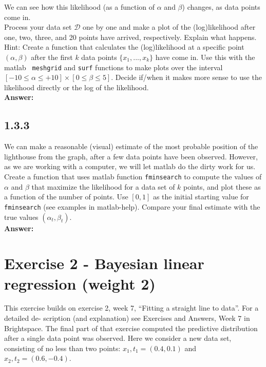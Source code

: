 \documentclass[a4paper]{article}
\begin{document}
We can see how this likelihood (as a function of $\alpha$ and $\beta$) changes, as data points come in.\\

Process your data set $\mathcal{D}$ one by one and make a plot of the (log)likelihood after one, two, three, and 20 points have arrived, respectively. Explain what happens.\\

Hint: Create a function that calculates the (log)likelihood at a specific point $(\alpha, \beta)$ after the first $k$ data points $\{x_1, . . . , x_k \}$ have come in. Use this with the matlab \texttt{ meshgrid} and \texttt{surf}  functions to make plots over the interval $[-10 \leq \alpha \leq +10] \times [0 \leq \beta \leq 5]$. Decide if/when it makes more sense to use the likelihood directly or the log of the likelihood.\\

\textbf{Answer:}\\



\subsection*{1.3.3}

We can make a reasonable (visual) estimate of the most probable position of the lighthouse from the graph, after a few data points have been observed. However, as we are working with a computer, we will let matlab do the dirty work for us.\\

Create a function that uses matlab function \texttt{fminsearch} to compute the values of $\alpha$ and $\beta$ that maximize the likelihood for a data set of $k$ points, and plot these as a function of the number of points. Use $[0, 1]$ as the initial starting value for \texttt{ fminsearch} (see examples in matlab-help). Compare your final estimate with the true values $(\alpha_t,\beta_t)$.\\

\textbf{Answer:}\\



\section*{Exercise 2 - Bayesian linear regression (weight 2)}

This exercise builds on exercise 2, week 7, “Fitting a straight line to data”. For a detailed de- scription (and explanation) see Exercises and Answers, Week 7 in Brightspace. The final part of that exercise computed the predictive distribution after a single data point was observed. Here we consider a new data set, consisting of no less than two points: ${x_1,t_1} = (0.4,0.1)$ and ${x_2, t_2} = (0.6, -0.4)$.
\end{document}
